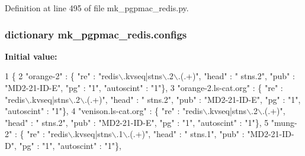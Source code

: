 Definition at line 495 of file mk\-\_\-pgpmac\-\_\-redis.\-py.

\hypertarget{namespacemk__pgpmac__redis_a9dc9b1bd47efd207604312cd60637526}{
\subsubsection[{configs}]{\setlength{\rightskip}{0pt plus 5cm}dictionary mk\-\_\-pgpmac\-\_\-redis.\-configs}}\label{namespacemk__pgpmac__redis_a9dc9b1bd47efd207604312cd60637526}
{\bfseries Initial value\-:}
\begin{DoxyCode}
1 \{
2     \textcolor{stringliteral}{"orange-2"}            : \{ \textcolor{stringliteral}{"re"} : \textcolor{stringliteral}{"redis\(\backslash\).kvseq|stns\(\backslash\).2\(\backslash\).(.+)"}, \textcolor{stringliteral}{"head"} : \textcolor{stringliteral}{"
      stns.2"}, \textcolor{stringliteral}{"pub"} : \textcolor{stringliteral}{"MD2-21-ID-E"}, \textcolor{stringliteral}{"pg"} : \textcolor{stringliteral}{"1"}, \textcolor{stringliteral}{"autoscint"} : \textcolor{stringliteral}{"1"}\},
3     \textcolor{stringliteral}{"orange-2.ls-cat.org"} : \{ \textcolor{stringliteral}{"re"} : \textcolor{stringliteral}{"redis\(\backslash\).kvseq|stns\(\backslash\).2\(\backslash\).(.+)"}, \textcolor{stringliteral}{"head"} : \textcolor{stringliteral}{"
      stns.2"}, \textcolor{stringliteral}{"pub"} : \textcolor{stringliteral}{"MD2-21-ID-E"}, \textcolor{stringliteral}{"pg"} : \textcolor{stringliteral}{"1"}, \textcolor{stringliteral}{"autoscint"} : \textcolor{stringliteral}{"1"}\},
4     \textcolor{stringliteral}{"venison.ls-cat.org"}  : \{ \textcolor{stringliteral}{"re"} : \textcolor{stringliteral}{"redis\(\backslash\).kvseq|stns\(\backslash\).2\(\backslash\).(.+)"}, \textcolor{stringliteral}{"head"} : \textcolor{stringliteral}{"
      stns.2"}, \textcolor{stringliteral}{"pub"} : \textcolor{stringliteral}{"MD2-21-ID-E"}, \textcolor{stringliteral}{"pg"} : \textcolor{stringliteral}{"1"}, \textcolor{stringliteral}{"autoscint"} : \textcolor{stringliteral}{"1"}\},
5     \textcolor{stringliteral}{"mung-2"}              : \{ \textcolor{stringliteral}{"re"} : \textcolor{stringliteral}{"redis\(\backslash\).kvseq|stns\(\backslash\).1\(\backslash\).(.+)"}, \textcolor{stringliteral}{"head"} : \textcolor{stringliteral}{"
      stns.1"}, \textcolor{stringliteral}{"pub"} : \textcolor{stringliteral}{"MD2-21-ID-D"}, \textcolor{stringliteral}{"pg"} : \textcolor{stringliteral}{"1"}, \textcolor{stringliteral}{"autoscint"} : \textcolor{stringliteral}{"1"}\},

\end{DoxyCode}
